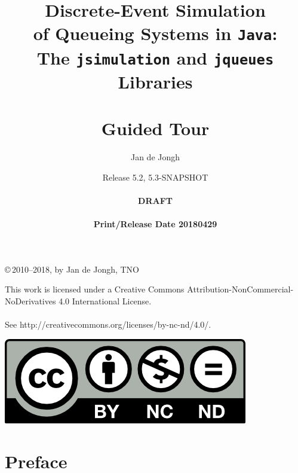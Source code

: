 \documentclass[12pt]{book}
\title{Discrete-Event Simulation\\
       of Queueing Systems in \texttt{Java}:\\
       The \texttt{jsimulation}
       and
       \texttt{jqueues}
       Libraries\\
       \mbox{ } \\
       Guided Tour}
\author{Jan de Jongh}
\date{Release 5.2, 5.3-SNAPSHOT\\
	  \mbox{ } \\
	  {\bf DRAFT}\\
	  \mbox{ }
	  \\{\bf Print/Release Date 20180429}}
\begin{document}
\maketitle

{%
	\vspace*{130mm}
	\thispagestyle{empty}
	\setlength{\parindent}{0pt}
	\copyright\,2010--2018, by Jan de Jongh, TNO
	\vspace*{40mm}
}%

\begin{mdframed}[
  outerlinecolor=black,
  outerlinewidth=2pt,
  linecolor=cccolor,
  middlelinewidth=3pt,
  roundcorner=10pt]
This work is licensed under a Creative Commons
  Attribution-NonCommercial-NoDerivatives
  4.0 International License.\\
  \\
See http://creativecommons.org/licenses/by-nc-nd/4.0/.
  \\
\begin{center}
  \includegraphics[scale=2]{fig/by-nc-nd}
\end{center}
\end{mdframed}



\chapter*{Preface}
\label{chap:preface}

\end{document}
